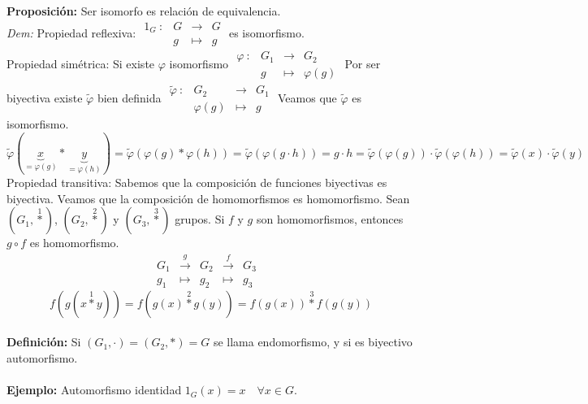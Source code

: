 \documentclass{article}
\begin{document}

\textbf{Proposición:} Ser isomorfo es relación de equivalencia.\\
\textit{Dem:} Propiedad reflexiva: $\begin{array}{cccc}
    1_G\::&G&\longrightarrow&G\\
        &g&\longmapsto&g
\end{array}$ es isomorfismo.\\
Propiedad simétrica: Si existe $\varphi$ isomorfismo $\begin{array}{cccc}
    \varphi\::&G_1&\longrightarrow&G_2\\
        &g&\longmapsto&\varphi(g)
\end{array}$ Por ser biyectiva existe $\tilde{\varphi}$ bien definida $\begin{array}{cccc}
    \tilde{\varphi}\::&G_2&\longrightarrow&G_1\\
        &\varphi(g)&\longmapsto&g
\end{array}$ Veamos que $\tilde{\varphi}$ es isomorfismo.
$$
\tilde{\varphi}(\underbrace{x}_{=\varphi(g)}*\underbrace{y}_{=\varphi(h)})=\tilde{\varphi}(\varphi(g)*\varphi(h))=\tilde{\varphi}(\varphi(g\cdot h))=g\cdot h = \tilde{\varphi}(\varphi(g))\cdot\tilde{\varphi}(\varphi(h))=\tilde{\varphi}(x)\cdot\tilde{\varphi}(y)
$$
Propiedad transitiva: Sabemos que la composición de funciones biyectivas es biyectiva. Veamos que la composición de homomorfismos es homomorfismo. Sean $(G_1, \overset{1}{*})$, $(G_2, \overset{2}{*})$ y $(G_3, \overset{3}{*})$ grupos. Si $f$ y $g$ son homomorfismos, entonces $g\circ f$ es homomorfismo.
$$
\begin{array}{cccccc}
    G_1 & \overset{g}{\longrightarrow} & G_2 & \overset{f}{\longrightarrow} & G_3\\
    g_1 &\longmapsto&g_2&\longmapsto&g_3
     & 
\end{array}
$$
$$
f(g(x\overset{1}{*}y))=f(g(x)\overset{2}{*}g(y))=f(g(x))\overset{3}{*}f(g(y))
$$\\


\textbf{Definición:} Si $(G_1,\cdot)=(G_2,*)=G$ se llama endomorfismo, y si es biyectivo automorfismo.\\\\


\textbf{Ejemplo:} Automorfismo identidad $1_G(x)=x \quad \forall x\in G$.\\\\
\end{document}
